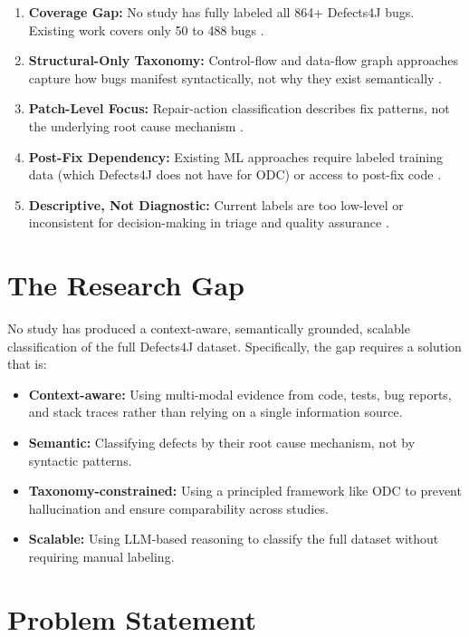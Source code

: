 \documentclass{iutbscthesis}
\begin{document}
\begin{enumerate}
    \item \textbf{Coverage Gap:} No study has fully labeled all 864+ Defects4J bugs. Existing work covers only 50 to 488 bugs \cite{sobreira2018dissection, vanderspuy2025anatomy, xuan2017better}.
    \item \textbf{Structural-Only Taxonomy:} Control-flow and data-flow graph approaches capture how bugs manifest syntactically, not why they exist semantically \cite{vanderspuy2025anatomy}.
    \item \textbf{Patch-Level Focus:} Repair-action classification describes fix patterns, not the underlying root cause mechanism \cite{sobreira2018dissection}.
    \item \textbf{Post-Fix Dependency:} Existing ML approaches require labeled training data (which Defects4J does not have for ODC) or access to post-fix code \cite{thung2012automatic}.
    \item \textbf{Descriptive, Not Diagnostic:} Current labels are too low-level or inconsistent for decision-making in triage and quality assurance \cite{catolino2019not}.
\end{enumerate}

\section{The Research Gap}

No study has produced a context-aware, semantically grounded, scalable classification of the full Defects4J dataset. Specifically, the gap requires a solution that is:

\begin{itemize}
    \item \textbf{Context-aware:} Using multi-modal evidence from code, tests, bug reports, and stack traces rather than relying on a single information source.
    \item \textbf{Semantic:} Classifying defects by their root cause mechanism, not by syntactic patterns.
    \item \textbf{Taxonomy-constrained:} Using a principled framework like ODC to prevent hallucination and ensure comparability across studies.
    \item \textbf{Scalable:} Using LLM-based reasoning to classify the full dataset without requiring manual labeling.
\end{itemize}

\section{Problem Statement}
\end{document}
